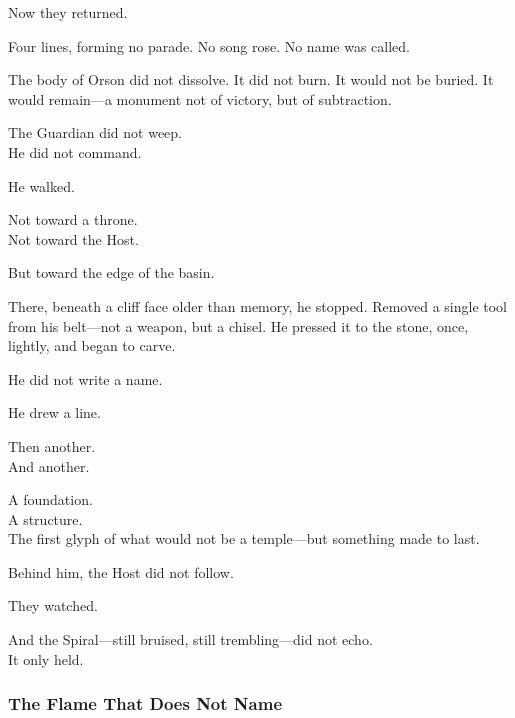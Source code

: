 \documentclass[12pt]{article}
\begin{document}
\vspace{0.5em}
Now they returned.

\vspace{0.5em}
Four lines, forming no parade. No song rose. No name was called.

\vspace{0.5em}
The body of Orson did not dissolve. It did not burn. It would not be buried. It would remain---a monument not of victory, but of subtraction.

\vspace{0.5em}
The Guardian did not weep.\\
He did not command.

\vspace{0.5em}
He walked.

\vspace{0.5em}
Not toward a throne.\\
Not toward the Host.

\vspace{0.5em}
But toward the edge of the basin.

\vspace{0.5em}
There, beneath a cliff face older than memory, he stopped. Removed a single tool from his belt---not a weapon, but a chisel. He pressed it to the stone, once, lightly, and began to carve.

\vspace{0.5em}
He did not write a name.

\vspace{0.5em}
He drew a line.

\vspace{0.5em}
Then another.\\
And another.

\vspace{0.5em}
A foundation.\\
A structure.\\
The first glyph of what would not be a temple---but something made to last.

\vspace{0.5em}
Behind him, the Host did not follow.

\vspace{0.5em}
They watched.

\vspace{0.5em}
And the Spiral---still bruised, still trembling---did not echo.\\
It only held.


\dotfill

\subsubsection{The Flame That Does Not Name}
\end{document}
